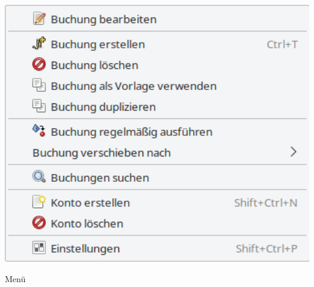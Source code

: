 \begin{minipage}{.3\linewidth}
	\vspace{-5pt}					%
	\centering						%
	\includegraphics[width=1\textwidth]{image/screenshot/home_menubar_edit}
	\vspace{-15pt}					%
	\captionsetup{
		type=figure,%
		name=Abb.,%
		labelsep=newline}			%
	\caption{Menü }	%
	\label{home_menubar_edit}
\end{minipage}

